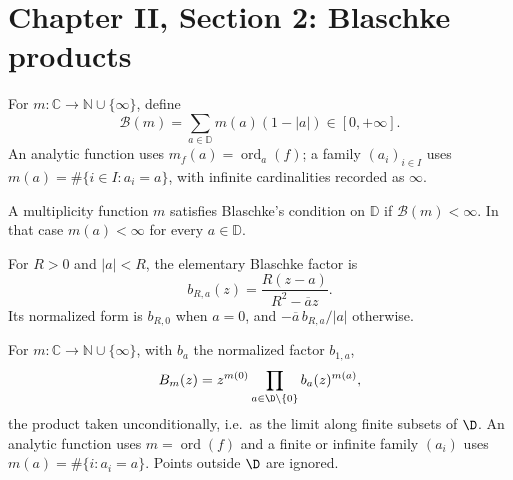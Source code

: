 \section{Chapter II, Section 2: Blaschke products}

\begin{definition}
  \label{def:blaschke_sum}
  \leanok
  For $m:\mathbb C\to\mathbb N\cup\{\infty\}$, define
  \[
    \mathcal B(m)=\sum_{a\in\mathbb D}m(a)(1-|a|)\in[0,+\infty].
  \]
  An analytic function uses $m_f(a)=\operatorname{ord}_a(f)$; a family
  $(a_i)_{i\in I}$ uses $m(a)=\#\{i\in I:a_i=a\}$, with infinite cardinalities
  recorded as $\infty$.
\end{definition}

\begin{definition}
  \label{def:blaschke_condition}
  \leanok
  A multiplicity function $m$ satisfies Blaschke's condition on $\mathbb D$
  if $\mathcal B(m)<\infty$. In that case $m(a)<\infty$ for every $a\in\mathbb D$.
\end{definition}

\begin{definition}
  \label{def:blaschke_factor}
  \leanok
  For $R>0$ and $|a|<R$, the elementary Blaschke factor is
  \[
    b_{R,a}(z)=\frac{R(z-a)}{R^2-\overline a z}.
  \]
  Its normalized form is $b_{R,0}$ when $a=0$, and
  $-\overline a\,b_{R,a}/|a|$ otherwise.
\end{definition}

\begin{definition}
  \label{def:blaschke_product}
  \leanok
  For $m:\mathbb C\to\mathbb N\cup\{\infty\}$, with $b_a$ the normalized factor
  $b_{1,a}$,
  \[
    B_m(z)=z^{m(0)}\prod_{a\in\D\setminus\{0\}}b_a(z)^{m(a)},
  \]
  the product taken unconditionally, i.e.\ as the limit along finite subsets of $\D$.
  An analytic function uses $m=\operatorname{ord}(f)$ and a finite or infinite
  family $(a_i)$ uses $m(a)=\#\{i:a_i=a\}$. Points outside $\D$ are ignored.
\end{definition}

